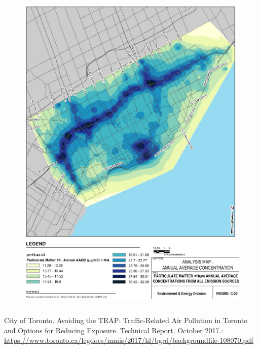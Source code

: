 \documentclass[aspectratio=169]{beamer}
\begin{document}
\begin{frame}
\begin{columns}
		\begin{column}{0.5\textwidth}
			\begin{figure}
				\centering
				\includegraphics[width=0.8\linewidth]{images/tor_pm10.png}
			\end{figure}
			
		\end{column}

	\end{columns}
	
	\tiny City of Toronto. Avoiding the TRAP: Traffic-Related Air Pollution in Toronto and Options
	for Reducing Exposure. Technical Report. October 2017.: \url{https://www.toronto.ca/legdocs/mmis/2017/hl/bgrd/backgroundfile-108070.pdf}
	
\end{frame}


\end{document}
